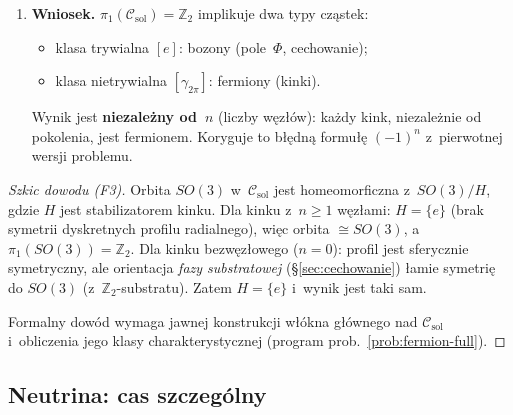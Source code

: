 \begin{proposition}[Dowód $\pi_1(\mathcal{C}_{\mathrm{sol}}) = \mathbb{Z}_2$
  --- szkic formalny]
\begin{enumerate}[(F1)]
  \item \textbf{Wniosek.}
    $\pi_1(\mathcal{C}_{\mathrm{sol}}) = \mathbb{Z}_2$
    implikuje dwa typy cz\k{a}stek:
    \begin{itemize}[nosep]
      \item klasa trywialna $[e]$: bozony (pole~$\Phi$, cechowanie);
      \item klasa nietrywialna $[\gamma_{2\pi}]$: fermiony (kinki).
    \end{itemize}
    Wynik jest \textbf{niezale\.zny od~$n$} (liczby w\k{e}z\l{}\'ow):
    ka\.zdy kink, niezale\.znie od pokolenia, jest fermionem.
    Koryguje to b\l{}\k{e}dn\k{a} formu\l{}\k{e} $(-1)^n$
    z~pierwotnej wersji problemu.
\end{enumerate}
\end{proposition}

\begin{proof}[Szkic dowodu (F3)]
Orbita $SO(3)$ w~$\mathcal{C}_{\mathrm{sol}}$ jest
homeomorficzna z~$SO(3)/H$, gdzie $H$ jest stabilizatorem
kinku. Dla kinku z~$n \geq 1$ w\k{e}z\l{}ami: $H = \{e\}$
(brak symetrii dyskretnych profilu radialnego),
wi\k{e}c orbita $\cong SO(3)$, a~$\pi_1(SO(3)) = \mathbb{Z}_2$.
Dla kinku bezw\k{e}z\l{}owego ($n = 0$): profil jest
sferycznie symetryczny, ale orientacja \emph{fazy substratowej}
(\S\ref{sec:cechowanie}) \l{}amie symetri\k{e} do $SO(3)$
(z~$\mathbb{Z}_2$-substratu). Zatem $H = \{e\}$ i~wynik
jest taki sam.

Formalny dow\'od wymaga jawnej konstrukcji w\l{}\'okna
g\l{}\'ownego nad $\mathcal{C}_{\mathrm{sol}}$ i~obliczenia
jego klasy charakterystycznej (program prob.~\ref{prob:fermion-full}).
\end{proof}

\subsection{Neutrina: cas szczeg\'olny}%
\label{app:F-neutrinos}

